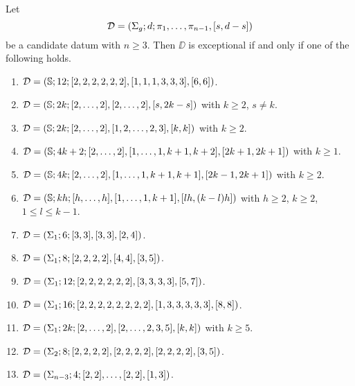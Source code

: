 \begin{solution-hurwitz*}
Let
\[
\mathcal{D}=(\Sigma_{g};d;\pi_1,\ldots,\pi_{n-1},[s,d-s])
\]
be a candidate datum with $n\ge 3$. Then $\DD$ is exceptional if and only if one of the following holds.
\begin{enumerate}[(1)]
\item $\mathcal{D}=(\mathbb{S}{};12;[2,2,2,2,2,2],[1,1,1,3,3,3],[6,6])$.
\item $\mathcal{D}=(\mathbb{S}{};2k;[2,\ldots,2],[2,\ldots,2],[s,2k-s])$ with $k\ge 2$, $s\neq k$.
\item $\mathcal{D}=(\mathbb{S}{};2k;[2,\ldots,2],[1,2,\ldots,2,3],[k,k])$ with $k\ge2$.
\item $\mathcal{D}=(\mathbb{S}{};4k+2;[2,\ldots,2],[1,\ldots,1,k+1,k+2],[2k+1,2k+1])$ with $k\ge 1$.
\item $\mathcal{D}=(\mathbb{S}{};4k;[2,\ldots,2],[1,\ldots,1,k+1,k+1],[2k-1,2k+1])$ with $k\ge2$.
\item $\mathcal{D}=(\mathbb{S}{};kh;[h,\ldots,h],[1,\ldots,1,k+1],[lh,(k-l)h])$ with $h\ge 2$, $k\ge 2$, $1\le l\le k-1$.
\item $\mathcal{D}=(\Sigma_{1};6;[3,3],[3,3],[2,4])$.
\item $\mathcal{D}=(\Sigma_{1};8;[2,2,2,2],[4,4],[3,5])$.
\item $\mathcal{D}=(\Sigma_{1};12;[2,2,2,2,2,2],[3,3,3,3],[5,7])$.
\item $\mathcal{D}=(\Sigma_{1};16;[2,2,2,2,2,2,2,2],[1,3,3,3,3,3],[8,8])$.
\item $\mathcal{D}=(\Sigma_{1};2k;[2,\ldots,2],[2,\ldots,2,3,5],[k,k])$ with $k\ge 5$.
\item $\mathcal{D}=(\Sigma_{2};8;[2,2,2,2],[2,2,2,2],[2,2,2,2],[3,5])$.
\item $\mathcal{D}=(\Sigma_{n-3};4;[2,2],\ldots,[2,2],[1,3])$.
\end{enumerate}
\end{solution-hurwitz*}
